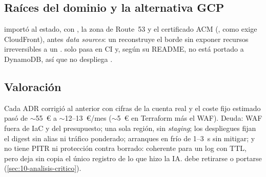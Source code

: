 \subsection{Raíces del dominio y la alternativa GCP}

 importó al estado, con , la zona de Route~53 y el certificado ACM
(, como exige CloudFront), antes \emph{data sources}: un  reconstruye el borde sin exponer
recursos irreversibles a un .  solo pasa  en CI y, según su README, no está
portado a DynamoDB, así que no despliega .

\subsection{Valoración}

Cada ADR corrigió al anterior con cifras de la cuenta real y el coste fijo estimado pasó de
\mbox{$\sim$55}~€ a \mbox{$\sim$12--13}~€/mes (\mbox{$\sim$5}~€ en Terraform más el WAF). Deuda:
WAF fuera de IaC y del presupuesto; una sola región, sin \emph{staging}; los
despliegues fijan el digest sin alias ni tráfico ponderado; arranques en frío de 1--3~s sin mitigar; y  no tiene PITR ni protección contra borrado: coherente para un log con TTL,
pero deja sin copia el único registro de lo que hizo la IA.  debe retirarse o
portarse (\cref{sec:10-analisis-critico}).
